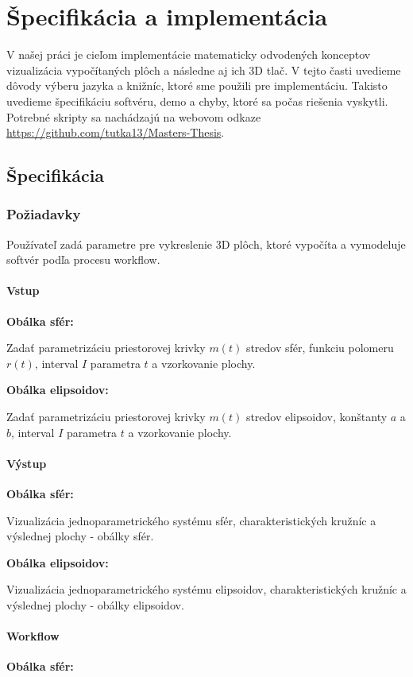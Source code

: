 \chapter{Špecifikácia a implementácia}
V našej práci je cieľom implementácie matematicky odvodených konceptov vizualizácia vypočítaných plôch a následne aj ich 3D tlač. V tejto časti uvedieme dôvody výberu jazyka a knižníc, ktoré sme použili pre implementáciu. Takisto uvedieme špecifikáciu softvéru, demo a chyby, ktoré sa počas riešenia vyskytli. Potrebné skripty sa nachádzajú na webovom odkaze \url{https://github.com/tutka13/Masters-Thesis}.
\section{Špecifikácia}
\subsection{Požiadavky}
Používateľ zadá parametre pre vykreslenie 3D plôch, ktoré vypočíta a vymodeluje softvér podľa procesu workflow.
\subsubsection{Vstup}
\textbf{Obálka sfér:}

Zadať parametrizáciu priestorovej krivky $m(t)$ stredov sfér, funkciu polomeru $r(t)$, interval $I$ parametra $t$ a vzorkovanie plochy.

\noindent \textbf{Obálka elipsoidov:}

Zadať parametrizáciu priestorovej krivky $m(t)$ stredov elipsoidov, konštanty $a$ a $b$, interval $I$ parametra $t$ a vzorkovanie plochy.
\subsubsection{Výstup} 
\textbf{Obálka sfér:}

Vizualizácia jednoparametrického systému sfér, charakteristických kružníc a výslednej plochy - obálky sfér.

\noindent \textbf{Obálka elipsoidov:}

Vizualizácia jednoparametrického systému elipsoidov, charakteristických kružníc a výslednej plochy - obálky elipsoidov.
\subsubsection{Workflow}
\textbf{Obálka sfér:}

